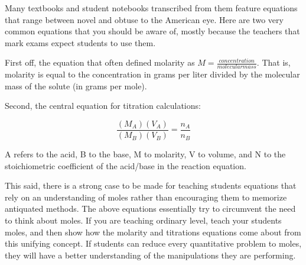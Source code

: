 Many textbooks and student notebooks transcribed from them feature equations that range between novel and obtuse to the American eye. Here are two very common equations that you should be aware of, mostly because the teachers that mark exams expect students to use them.

First off, the equation that often defined molarity as $M = \frac{concentration}{molecular mass}$. That is, molarity is equal to the concentration in grams per liter divided by the molecular mass of the solute (in grams per mole).

Second, the central equation for titration calculations: 

\[ \frac{(M_A)(V_A)}{(M_B)(V_B)} = \frac{n_A}{n_B} \]

A refers to the acid, B to the base, M to molarity, V to volume, and N to the stoichiometric coefficient of the acid/base in the reaction equation.

This said, there is a strong case to be made for teaching students equations that rely on an understanding of moles rather than encouraging them to memorize antiquated methods. The above equations essentially try to circumvent the need to think about moles. If you are teaching ordinary level, teach your students moles, and then show how the molarity and titrations equations come about from this unifying concept. If students can reduce every quantitative problem to moles, they will have a better understanding of the manipulations they are performing.
